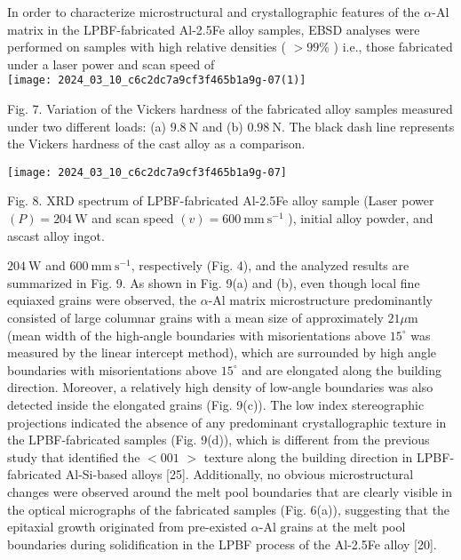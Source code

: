 \documentclass[10pt]{article}
\begin{document}
In order to characterize microstructural and crystallographic features of the $\alpha$-Al matrix in the LPBF-fabricated Al-2.5Fe alloy samples, EBSD analyses were performed on samples with high relative densities ( $>99 \%$ ) i.e., those fabricated under a laser power and scan speed of\\
\texttt{[image: 2024\_03\_10\_c6c2dc7a9cf3f465b1a9g-07(1)]}

Fig. 7. Variation of the Vickers hardness of the fabricated alloy samples measured under two different loads: (a) $9.8 \mathrm{~N}$ and (b) $0.98 \mathrm{~N}$. The black dash line represents the Vickers hardness of the cast alloy as a comparison.

\begin{center}
\texttt{[image: 2024\_03\_10\_c6c2dc7a9cf3f465b1a9g-07]}
\end{center}

Fig. 8. XRD spectrum of LPBF-fabricated Al-2.5Fe alloy sample (Laser power $(P)=204 \mathrm{~W}$ and scan speed $(v)=600 \mathrm{~mm} \mathrm{~s}^{-1}$ ), initial alloy powder, and ascast alloy ingot.

$204 \mathrm{~W}$ and $600 \mathrm{~mm} \mathrm{~s}^{-1}$, respectively (Fig. 4), and the analyzed results are summarized in Fig. 9. As shown in Fig. 9(a) and (b), even though local fine equiaxed grains were observed, the $\alpha$-Al matrix microstructure predominantly consisted of large columnar grains with a mean size of approximately $21 \mu \mathrm{m}$ (mean width of the high-angle boundaries with misorientations above $15^{\circ}$ was measured by the linear intercept method), which are surrounded by high angle boundaries with misorientations above $15^{\circ}$ and are elongated along the building direction. Moreover, a relatively high density of low-angle boundaries was also detected inside the elongated grains (Fig. 9(c)). The low index stereographic projections indicated the absence of any predominant crystallographic texture in the LPBF-fabricated samples (Fig. 9(d)), which is different from the previous study that identified the $<001$ $>$ texture along the building direction in LPBF-fabricated Al-Si-based alloys [25]. Additionally, no obvious microstructural changes were observed around the melt pool boundaries that are clearly visible in the optical micrographs of the fabricated samples (Fig. 6(a)), suggesting that the epitaxial growth originated from pre-existed $\alpha$-Al grains at the melt pool boundaries during solidification in the LPBF process of the Al-2.5Fe alloy [20].
\end{document}
